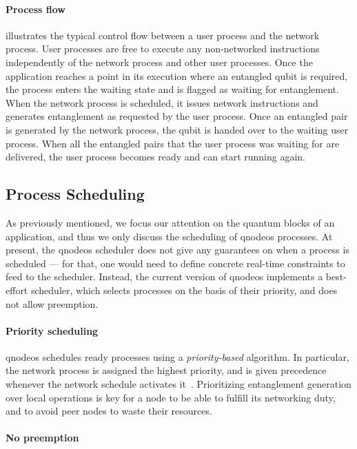 \paragraph{Process flow}

 illustrates the typical control flow between a user process and the network
process. User processes are free to execute any non-networked instructions independently of the
network process and other user processes. Once the application reaches a point in its execution
where an entangled qubit is required, the process enters the waiting state and is flagged as waiting
for entanglement. When the network process is scheduled, it issues network instructions and
generates entanglement as requested by the user process. Once an entangled pair is generated by the
network process, the qubit is handed over to the waiting user process. When all the entangled pairs
that the user process was waiting for are delivered, the user process becomes ready and can start
running again.

\subsection{Process Scheduling}

As previously mentioned, we focus our attention on the quantum blocks of an application, and thus we
only discuss the scheduling of \acrshort{qnodeos} processes. At present, the \acrshort{qnodeos}
scheduler does not give any guarantees on when a process is scheduled --- for that, one would need
to define concrete real-time constraints to feed to the scheduler. Instead, the current version of
\acrshort{qnodeos} implements a best-effort scheduler, which selects processes on the basis of their
priority, and does not allow preemption.

\paragraph{Priority scheduling}

\acrshort{qnodeos} schedules ready processes using a \emph{priority-based} algorithm. In particular,
the network process is assigned the highest priority, and is given precedence whenever the network
schedule activates it~\cite{skrzypczyk_2021_arch}. Prioritizing entanglement generation over local
operations is key for a node to be able to fulfill its networking duty, and to avoid peer nodes to
waste their resources.

\paragraph{No preemption}

